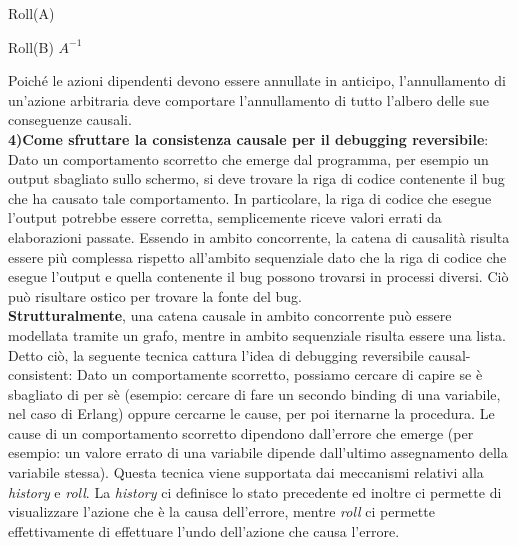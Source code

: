 \documentclass[background.tex]{subfiles}
\begin{document}
\begin{algorithm}[H]
\caption{Roll(A)}
\begin{algorithmic} 
		\STATE Roll(B)
	\ENDFOR
	\STATE $A^{-1}$
\end{algorithmic}
\end{algorithm}
Poiché le azioni dipendenti devono essere annullate in anticipo, l'annullamento di un'azione arbitraria deve comportare l'annullamento di tutto l'albero delle sue conseguenze causali.\\
\textbf{4)Come sfruttare la consistenza causale per il debugging reversibile}:\\
Dato un comportamento scorretto che emerge dal programma, per esempio un output sbagliato sullo schermo, si deve trovare la riga di codice contenente il bug che ha causato tale comportamento. In particolare, la riga di codice che esegue l'output potrebbe essere corretta, semplicemente riceve valori errati da elaborazioni passate. Essendo in ambito concorrente, la catena di causalità risulta essere più complessa rispetto all'ambito sequenziale dato che la riga di codice che esegue l'output e quella contenente il bug possono trovarsi in processi diversi. Ciò può risultare ostico per trovare la fonte del bug.\\
\textbf{Strutturalmente}, una catena causale in ambito concorrente può essere modellata tramite un grafo, mentre in ambito sequenziale risulta essere una lista.
Detto ciò, la seguente tecnica cattura l'idea di debugging reversibile causal-consistent:
Dato un comportamente scorretto, possiamo cercare di capire se è sbagliato di per sè (esempio: cercare di fare un secondo binding di una variabile, nel caso di Erlang) oppure cercarne le cause, per poi iternarne la procedura. Le cause di un comportamento scorretto dipendono dall'errore che emerge (per esempio: un valore errato di una variabile dipende dall'ultimo assegnamento della variabile stessa).
Questa tecnica viene supportata dai meccanismi relativi alla \textit{history} e \textit{roll}. La \textit{history} ci definisce lo stato precedente ed inoltre ci permette di visualizzare l'azione che è la causa dell'errore, mentre \textit{roll} ci permette effettivamente di effettuare l'undo dell'azione che causa l'errore.
\end{document}

